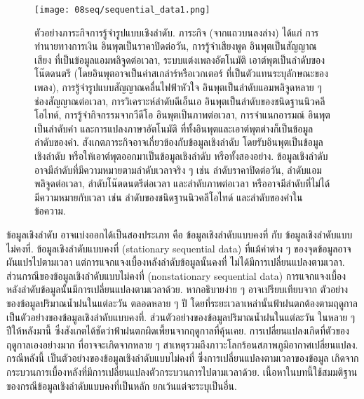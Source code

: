 %
\begin{figure}
	\begin{center}
	\texttt{[image: 08seq/sequential\_data1.png]}	
	\caption[ตัวอย่างภาระกิจการรู้จำรูปแบบเชิงลำดับ]{ตัวอย่างภาระกิจการรู้จำรูปแบบเชิงลำดับ.
ภาระกิจ (จากแถวบนลงล่าง) ได้แก่ การทำนายทางการเงิน อินพุตเป็นราคาปิดต่อวัน, 
การรู้จำเสียงพูด อินพุตเป็นสัญญาณเสียง ที่เป็นข้อมูลแอมพลิจูดต่อเวลา, 
ระบบแต่งเพลงอัตโนมัติ เอาต์พุตเป็นลำดับของโน๊ตดนตรี (โดยอินพุตอาจเป็นค่าสเกล่าร์หรือเวกเตอร์ ที่เป็นตัวแทนระบุลักษณะของเพลง), 
การรู้จำรูปแบบสัญญาณคลื่นไฟฟ้าหัวใจ
อินพุตเป็นลำดับแอมพลิจูดหลาย ๆ ช่องสัญญาณต่อเวลา,
การวิเคราะห์ลำดับดีเอ็นเอ อินพุตเป็นลำดับของชนิดฐานนิวคลีโอไทด์,
การรู้จำกิจกรรมจากวีดีโอ อินพุตเป็นภาพต่อเวลา,
การจำแนกอารมณ์ อินพุตเป็นลำดับคำ
และการแปลงภาษาอัตโนมัติ ที่ทั้งอินพุตและเอาต์พุตต่างก็เป็นข้อมูลลำดับของคำ.
สังเกตภาระกิจอาจเกี่ยวข้องกับข้อมูลเชิงลำดับ โดยรับอินพุตเป็นข้อมูลเชิงลำดับ หรือให้เอาต์พุตออกมาเป็นข้อมูลเชิงลำดับ หรือทั้งสองอย่าง.
ข้อมูลเชิงลำดับ อาจมีลำดับที่มีความหมายตามลำดับเวลาจริง ๆ เช่น ลำดับราคาปิดต่อวัน, ลำดับแอมพลิจูดต่อเวลา, ลำดับโน๊ตดนตรีต่อเวลา
และลำดับภาพต่อเวลา
หรืออาจมีลำดับที่ไม่ได้มีความหมายกับเวลา เช่น ลำดับของชนิดฐานนิวคลีโอไทด์ และลำดับของคำในข้อความ. 
}
	\label{fig: seq sequential pattern recognition tasks}
	\end{center}
\end{figure}
%

ข้อมูลเชิงลำดับ อาจแบ่งออกได้เป็นสองประเภท คือ ข้อมูลเชิงลำดับแบบคงที่  กับ 
ข้อมูลเชิงลำดับแบบไม่คงที่.
ข้อมูลเชิงลำดับแบบคงที่ (stationary sequential data)
ที่แม้ค่าต่าง ๆ ของจุดข้อมูลอาจผันแปรไปตามเวลา แต่การแจกแจงเบื้องหลังลำดับข้อมูลนั้นคงที่ ไม่ได้มีการเปลี่ยนแปลงตามเวลา.
ส่วนกรณีของข้อมูลเชิงลำดับแบบไม่คงที่ (nonstationary sequential data) การแจกแจงเบื้องหลังลำดับข้อมูลนั้นมีการเปลี่ยนแปลงตามเวลาด้วย.
หากอธิบายง่าย ๆ อาจเปรียบเทียบจาก 
ตัวอย่างของข้อมูลปริมาณน้ำฝนในแต่ละวัน ตลอดหลาย ๆ ปี โดยที่ระยะเวลาเหล่านั้นฟ้าฝนตกต้องตามฤดูกาล
เป็นตัวอย่างของข้อมูลเชิงลำดับแบบคงที่.
ส่วนตัวอย่างของข้อมูลปริมาณน้ำฝนในแต่ละวัน ในหลาย ๆ ปีให้หลังมานี้ 
ซึ่งสังเกตได้ชัดว่าฟ้าฝนตกผิดเพี้ยนจากฤดูกาลที่คุ้นเคย.
การเปลี่ยนแปลงเกิดที่ตัวของฤดูกาลเองอย่างมาก
ที่อาจจะเกิดจากหลาย ๆ สาเหตุรวมถึงภาวะโลกร้อนสภาพภูมิอากาศเปลี่ยนแปลง.
กรณีหลังนี้ เป็นตัวอย่างของข้อมูลเชิงลำดับแบบไม่คงที่
ซึ่งการเปลี่ยนแปลงตามเวลาของข้อมูล
เกิดจากกระบวนการเบื้องหลังที่มีการเปลี่ยนแปลงตัวกระบวนการไปตามเวลาด้วย.
%
เนื้อหาในบทนี้ใช้สมมติฐานของกรณีข้อมูลเชิงลำดับแบบคงที่เป็นหลัก ยกเว้นแต่จะระบุเป็นอื่น.

